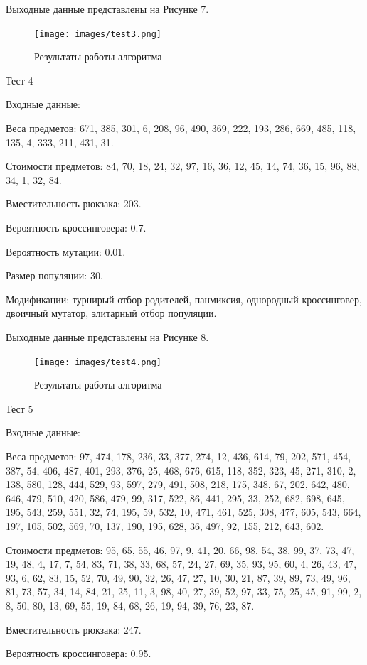 \documentclass{article}
\begin{document}
\begin{enumerate}
Выходные данные представлены на Рисунке 7.
\begin{figure}[h!]
\centering
\texttt{[image: images/test3.png]}
\caption{Результаты работы алгоритма}
\label{fig:mpr}
\end{figure}

Тест 4

Входные данные:

Веса предметов: 671, 385, 301, 6, 208, 96, 490, 369, 222, 193, 286, 669, 485, 118, 135, 4, 333, 211, 431, 31.

Стоимости предметов: 84, 70, 18, 24, 32, 97, 16, 36, 12, 45, 14, 74, 36, 15, 96, 88, 34, 1, 32, 84.

Вместительность рюкзака: 203.

Вероятность кроссинговера: 0.7.

Вероятность мутации: 0.01.

Размер популяции: 30.

Модификации: турнирый отбор родителей, панмиксия, однородный кроссинговер, двоичный мутатор, элитарный отбор популяции.

Выходные данные представлены на Рисунке 8.
\begin{figure}[h!]
\centering
\texttt{[image: images/test4.png]}
\caption{Результаты работы алгоритма}
\label{fig:mpr}
\end{figure}

Тест 5

Входные данные:

Веса предметов: 97, 474, 178, 236, 33, 377, 274, 12, 436, 614, 79, 202, 571, 454, 387, 54, 406, 487, 401, 293, 376, 25, 468, 676, 615, 118, 352, 323, 45, 271, 310, 2, 138, 580, 128, 444, 529, 93, 597, 279, 491, 508, 218, 175, 348, 67, 202, 642, 480, 646, 479, 510, 420, 586, 479, 99, 317, 522, 86, 441, 295, 33, 252, 682, 698, 645, 195, 543, 259, 551, 32, 74, 195, 59, 532, 10, 471, 461, 525, 308, 477, 605, 543, 664, 197, 105, 502, 569, 70, 137, 190, 195, 628, 36, 497, 92, 155, 212, 643, 602.

Стоимости предметов: 95, 65, 55, 46, 97, 9, 41, 20, 66, 98, 54, 38, 99, 37, 73, 47, 19, 48, 4, 17, 7, 54, 83, 71, 38, 33, 68, 57, 24, 27, 69, 35, 93, 95, 60, 4, 26, 43, 47, 93, 6, 62, 83, 15, 52, 70, 49, 90, 32, 26, 47, 27, 10, 30, 21, 87, 39, 89, 73, 49, 96, 81, 73, 57, 34, 14, 84, 21, 25, 11, 3, 98, 40, 27, 39, 52, 97, 33, 75, 25, 45, 91, 99, 2, 8, 50, 80, 13, 69, 55, 19, 84, 68, 26, 19, 94, 39, 76, 23, 87.

Вместительность рюкзака: 247.

Вероятность кроссинговера: 0.95.


\end{enumerate}
\end{document}
